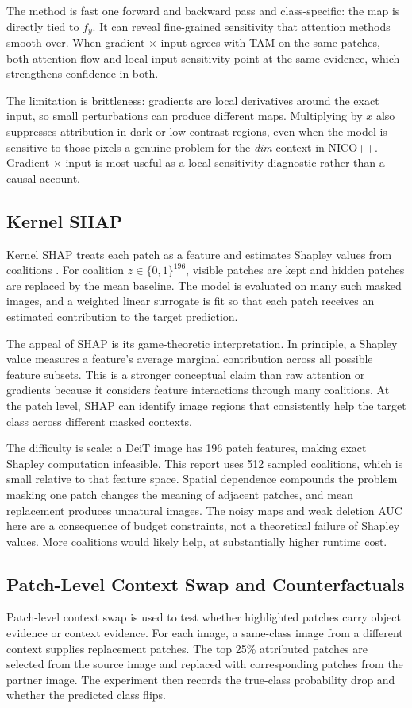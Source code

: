 \documentclass[10pt]{article}
\begin{document}
The method is fast one forward and backward pass and class-specific: the map is directly tied to $f_y$. It can reveal fine-grained sensitivity that attention methods smooth over. When gradient $\times$ input agrees with TAM on the same patches, both attention flow and local input sensitivity point at the same evidence, which strengthens confidence in both.

The limitation is brittleness: gradients are local derivatives around the exact input, so small perturbations can produce different maps. Multiplying by $x$ also suppresses attribution in dark or low-contrast regions, even when the model is sensitive to those pixels a genuine problem for the \emph{dim} context in NICO++. Gradient $\times$ input is most useful as a local sensitivity diagnostic rather than a causal account.

\subsection{Kernel SHAP}
Kernel SHAP treats each patch as a feature and estimates Shapley values from coalitions \cite{lundberg2017unified}. For coalition $z\in\{0,1\}^{196}$, visible patches are kept and hidden patches are replaced by the mean baseline. The model is evaluated on many such masked images, and a weighted linear surrogate is fit so that each patch receives an estimated contribution to the target prediction.

The appeal of SHAP is its game-theoretic interpretation. In principle, a Shapley value measures a feature's average marginal contribution across all possible feature subsets. This is a stronger conceptual claim than raw attention or gradients because it considers feature interactions through many coalitions. At the patch level, SHAP can identify image regions that consistently help the target class across different masked contexts.

The difficulty is scale: a DeiT image has 196 patch features, making exact Shapley computation infeasible. This report uses 512 sampled coalitions, which is small relative to that feature space. Spatial dependence compounds the problem masking one patch changes the meaning of adjacent patches, and mean replacement produces unnatural images. The noisy maps and weak deletion AUC here are a consequence of budget constraints, not a theoretical failure of Shapley values. More coalitions would likely help, at substantially higher runtime cost.

\subsection{Patch-Level Context Swap and Counterfactuals}
Patch-level context swap is used to test whether highlighted patches carry object evidence or context evidence. For each image, a same-class image from a different context supplies replacement patches. The top 25\% attributed patches are selected from the source image and replaced with corresponding patches from the partner image. The experiment then records the true-class probability drop and whether the predicted class flips.
\end{document}
